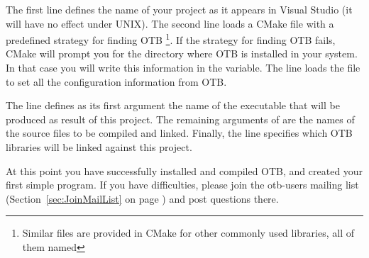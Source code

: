 The first line defines the name of your project as it appears in Visual
Studio (it will have no effect under UNIX). The second line loads a CMake
file with a predefined strategy for finding OTB \footnote{Similar files are
provided in CMake for other commonly used libraries, all of them named
}. If the strategy for finding OTB fails, CMake will prompt
you for the directory where OTB is installed in your system. In that case you
will write this information in the  variable. The line  loads the  file to set
all the configuration information from OTB.


The line 
defines as its first argument the name of the executable that will be produced
as result of this project. The remaining arguments of 
are the names of the source files to be compiled and linked.  Finally, the
 line specifies which OTB libraries will be
linked against this project.




At this point you have successfully installed and compiled OTB, and created
your first simple program. If you have difficulties, please join the
otb-users mailing list (Section~\ref{sec:JoinMailList} on page
\pageref{sec:JoinMailList}) and post questions there.
